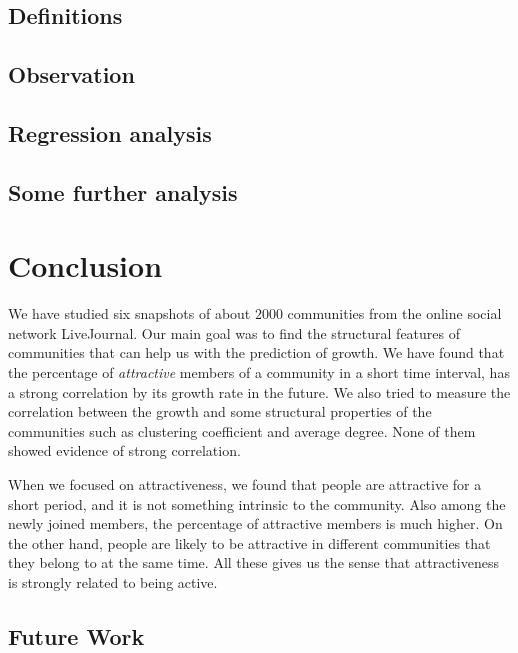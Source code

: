 \documentclass{sig-alternate}
\begin{document}
\subsection{Definitions} \label{sec: definitions}


\subsection{Observation} \label{sec: initial}



\subsection{Regression analysis}\label{sec: regression}


\newpage
\subsection{Some further analysis}


\section{Conclusion}

We have studied six snapshots of about $2000$ communities from the online social network LiveJournal. Our main goal was to find the structural features of communities that can help us with the prediction of growth. We have found that the percentage of \emph{attractive} members of a community in a short time interval, has a strong correlation by its growth rate in the future. We also tried to measure the correlation between the growth and some structural properties of the communities such as  clustering coefficient and average degree. None of them showed evidence of strong correlation.

When we focused on  attractiveness, we found that people are attractive for a short period, and it is not something intrinsic to the community. Also among the newly joined members, the percentage of attractive members is much higher. On the other hand, people are likely to be attractive in different communities that they belong to at the same time.  All these gives us the sense that attractiveness is strongly related to being active.

\subsection{Future Work}
\end{document}
